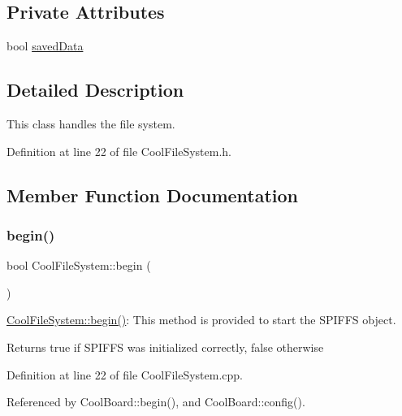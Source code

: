 \subsection*{Private Attributes}
\begin{DoxyCompactItemize}
\item 
bool \hyperlink{classCoolFileSystem_ad398e0c5c41a0c88acdf5d672aa71351}{saved\+Data}
\end{DoxyCompactItemize}


\subsection{Detailed Description}
This class handles the file system. 

Definition at line 22 of file Cool\+File\+System.\+h.



\subsection{Member Function Documentation}
\mbox{\label{classCoolFileSystem_a6ba6f666ed4c530174f8569d2c636748}} 
\subsubsection{\texorpdfstring{begin()}{begin()}}
{\footnotesize\ttfamily bool Cool\+File\+System\+::begin (\begin{DoxyParamCaption}{ }\end{DoxyParamCaption})}

\hyperlink{classCoolFileSystem_a6ba6f666ed4c530174f8569d2c636748}{Cool\+File\+System\+::begin()}\+: This method is provided to start the S\+P\+I\+F\+FS object.

\begin{DoxyReturn}{Returns}
true if S\+P\+I\+F\+FS was initialized correctly, false otherwise 
\end{DoxyReturn}


Definition at line 22 of file Cool\+File\+System.\+cpp.



Referenced by Cool\+Board\+::begin(), and Cool\+Board\+::config().



